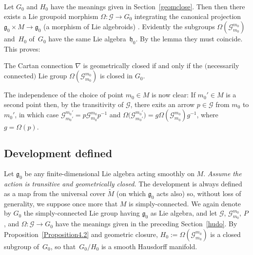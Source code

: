 Let $G_0$ and $H_0$ have the meanings given in Section~\ref{geomclose}. Then
then there exists a Lie groupoid morphism $\Omega \colon {\mathcal G}
\rightarrow G_0$ integrating the canonical projection ${\mathfrak g}_0
\times M \rightarrow {\mathfrak g}_0$ (a morphism of Lie algebroids)
\cite[Lie~II]{Crainic_Fernandes_11}. Evidently the subgroups
$\Omega({\mathcal G}_{m_0}^{m_0})$ and~$H_0$ of~$G_0$ have the same
Lie algebra~${\mathfrak h}_0$. By the lemma they must coincide. This
proves:
\begin{PropositionBlaom}\label{Proposition4.2}
  The Cartan connection $\nabla$ is geometrically closed if and only
  if the $($necessarily connected$)$ Lie group $\Omega({\mathcal
    G}^{m_0}_{m_0})$ is closed in $G_0$.
\end{PropositionBlaom}

The independence of the choice of point $m_0 \in M$ is now clear: If
$m_0' \in M$ is a second point then, by the transitivity of ${\mathcal
  G} $, there exits an arrow $p \in {\mathcal G} $ from $m_0$ to
$m_0'$, in which case ${\mathcal G}^{m_0'}_{m_0'}=p {\mathcal
  G}^{m_0}_{m_0} p^{-1}$ and $\Omega\big({\mathcal G}^{m_0'}_{m_0'}\big)=g
\Omega({\mathcal G}^{m_0}_{m_0})g^{-1}$, where $g=\Omega(p)$.

\subsection{Development def\/ined}\label{devmap}
Let ${\mathfrak g}_0$ be any f\/inite-dimensional Lie algebra acting
smoothly on $M$.  {\em Assume the action is transitive and
  geometrically closed.}  The development is always def\/ined as a map
from the universal cover $\tilde M$ (on which ${\mathfrak g}_0$ acts
also) so, without loss of generality, we suppose once more that $M$ is
simply-connected. We again denote by $G_0$ the simply-connected Lie
group having ${\mathfrak g}_0 $ as Lie algebra, and let ${\mathcal
  G}$, ${\mathcal G}^{m_0}_{m_0}$, $P$, and $\Omega \colon {\mathcal
  G} \rightarrow G_0$ have the meanings given in the preceding
Section~\ref{hudo}. By Proposition~\ref{Proposition4.2} %
and geometric closure,
$H_0:=\Omega({\mathcal G}^{m_0}_{m_0})$ is a closed subgroup of~$G_0$,
so that~$G_0/H_0$ is a smooth Hausdorf\/f manifold.

